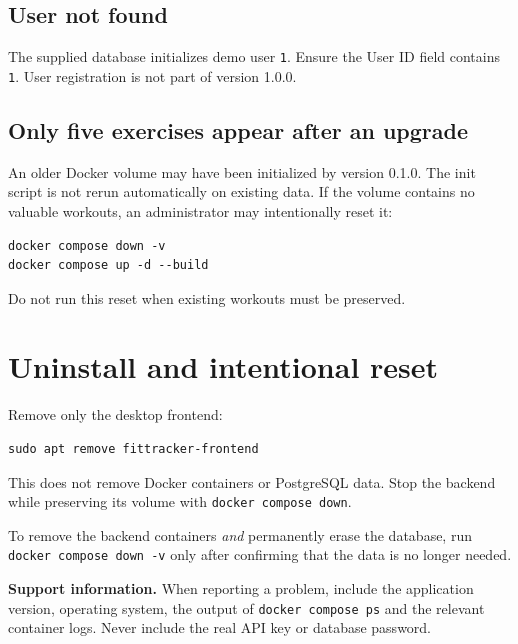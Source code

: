 \documentclass[11pt,a4paper]{article}
\begin{document}
\subsection{User not found}

The supplied database initializes demo user \texttt{1}. Ensure the User ID
field contains \texttt{1}. User registration is not part of version 1.0.0.

\subsection{Only five exercises appear after an upgrade}

An older Docker volume may have been initialized by version 0.1.0. The init
script is not rerun automatically on existing data. If the volume contains no
valuable workouts, an administrator may intentionally reset it:

\begin{lstlisting}[caption={Destructive reset - deletes all workout data}]
docker compose down -v
docker compose up -d --build
\end{lstlisting}

Do not run this reset when existing workouts must be preserved.

\section{Uninstall and intentional reset}

Remove only the desktop frontend:

\begin{lstlisting}[caption={Uninstalling the Debian frontend}]
sudo apt remove fittracker-frontend
\end{lstlisting}

This does not remove Docker containers or PostgreSQL data. Stop the backend
while preserving its volume with \texttt{docker compose down}.

To remove the backend containers \emph{and} permanently erase the database,
run \texttt{docker compose down -v} only after confirming that the data is no
longer needed.

\textbf{Support information.} When reporting a problem, include the application
version, operating system, the output of \texttt{docker compose ps} and the
relevant container logs. Never include the real API key or database password.
\end{document}
